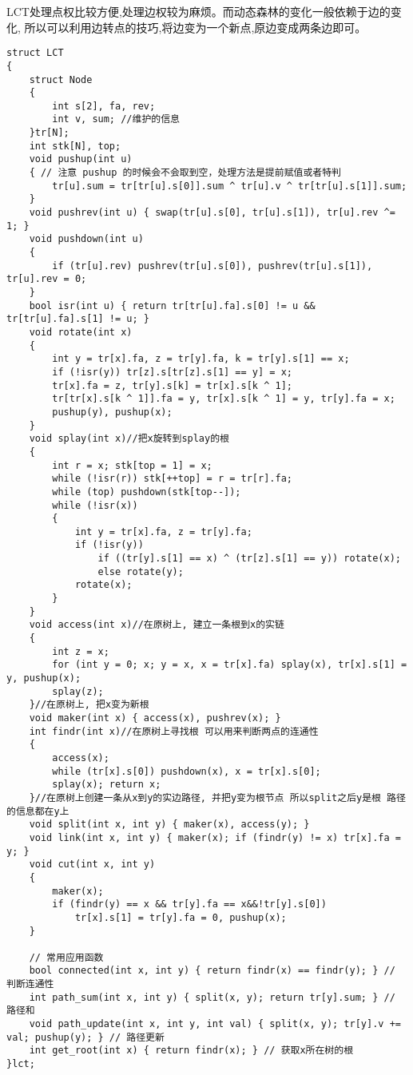 \documentclass[a4paper, fontset=none]{ctexart}
\begin{document}
LCT处理点权比较方便,处理边权较为麻烦。而动态森林的变化一般依赖于边的变化,
所以可以利用边转点的技巧,将边变为一个新点,原边变成两条边即可。
\begin{verbatim}
struct LCT
{
    struct Node
    {
        int s[2], fa, rev;
        int v, sum; //维护的信息
    }tr[N];
    int stk[N], top;
    void pushup(int u)
    { // 注意 pushup 的时候会不会取到空，处理方法是提前赋值或者特判
        tr[u].sum = tr[tr[u].s[0]].sum ^ tr[u].v ^ tr[tr[u].s[1]].sum;
    }
    void pushrev(int u) { swap(tr[u].s[0], tr[u].s[1]), tr[u].rev ^= 1; }
    void pushdown(int u)
    {
        if (tr[u].rev) pushrev(tr[u].s[0]), pushrev(tr[u].s[1]), tr[u].rev = 0;
    }
    bool isr(int u) { return tr[tr[u].fa].s[0] != u && tr[tr[u].fa].s[1] != u; }
    void rotate(int x)
    {
        int y = tr[x].fa, z = tr[y].fa, k = tr[y].s[1] == x;
        if (!isr(y)) tr[z].s[tr[z].s[1] == y] = x;
        tr[x].fa = z, tr[y].s[k] = tr[x].s[k ^ 1];
        tr[tr[x].s[k ^ 1]].fa = y, tr[x].s[k ^ 1] = y, tr[y].fa = x;
        pushup(y), pushup(x);
    }
    void splay(int x)//把x旋转到splay的根
    {
        int r = x; stk[top = 1] = x;
        while (!isr(r)) stk[++top] = r = tr[r].fa;
        while (top) pushdown(stk[top--]);
        while (!isr(x))
        {
            int y = tr[x].fa, z = tr[y].fa;
            if (!isr(y))
                if ((tr[y].s[1] == x) ^ (tr[z].s[1] == y)) rotate(x);
                else rotate(y);
            rotate(x);
        }
    }
    void access(int x)//在原树上, 建立一条根到x的实链
    {
        int z = x;
        for (int y = 0; x; y = x, x = tr[x].fa) splay(x), tr[x].s[1] = y, pushup(x);
        splay(z);
    }//在原树上, 把x变为新根
    void maker(int x) { access(x), pushrev(x); }
    int findr(int x)//在原树上寻找根 可以用来判断两点的连通性
    {
        access(x);
        while (tr[x].s[0]) pushdown(x), x = tr[x].s[0];
        splay(x); return x;
    }//在原树上创建一条从x到y的实边路径, 并把y变为根节点 所以split之后y是根 路径的信息都在y上
    void split(int x, int y) { maker(x), access(y); }
    void link(int x, int y) { maker(x); if (findr(y) != x) tr[x].fa = y; }
    void cut(int x, int y)
    {
        maker(x);
        if (findr(y) == x && tr[y].fa == x&&!tr[y].s[0])
            tr[x].s[1] = tr[y].fa = 0, pushup(x);
    }

    // 常用应用函数
    bool connected(int x, int y) { return findr(x) == findr(y); } // 判断连通性
    int path_sum(int x, int y) { split(x, y); return tr[y].sum; } // 路径和
    void path_update(int x, int y, int val) { split(x, y); tr[y].v += val; pushup(y); } // 路径更新
    int get_root(int x) { return findr(x); } // 获取x所在树的根
}lct;

\end{verbatim}
\end{document}
